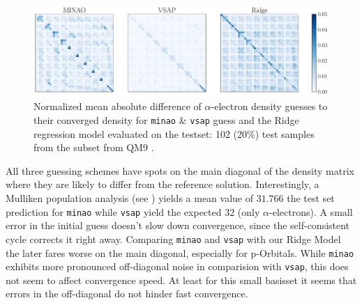 \begin{figure}[H]
    \centering
    \includegraphics[width=\textwidth]{../fig/c5h4n2o2/density_error_comparison.pdf}
    \caption[Normalized difference of density guesses]{Normalized mean absolute difference of $\alpha$-electron density guesses to their converged density for \texttt{minao} \& \texttt{vsap} guess and the Ridge regression model evaluated on the testset: 102 (20\%) test samples from the  subset from QM9 \parencite{ref:article1_qm9}.}
    \label{fig:density_error_comparison}
\end{figure}
All three guessing schemes have spots on the main diagonal of the density matrix where they are likely to differ from the reference solution. Interestingly, a Mulliken population analysis (see ) \parencite{ref:Mulliken_population_analysis} yields a mean value of $31.766$ the test set prediction for \texttt{minao} while \texttt{vsap} yield the expected $32$ (only $\alpha$-electrons). A small error in the initial guess doesn't slow down convergence, since the self-consistent cycle corrects it right away. Comparing \texttt{minao} and \texttt{vsap} with our Ridge Model the later fares worse on the main diagonal, especially for p-Orbitals. While \texttt{minao} exhibits more pronounced off-diagonal noise in comparision with \texttt{vsap}, this does not seem to affect convergence speed. At least for this small basisset it seems that errors in the off-diagonal do not hinder fast convergence.\\

